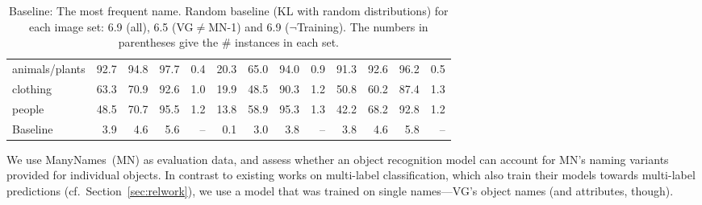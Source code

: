\begin{table*}
\begin{tabular}{l@{~}|@{~}r@{~}r@{~}rr@{~}|@{~}r@{~}r@{~}rr@{~}|@{~}r@{~}r@{~}rr}
		animals/plants &               92.7 &                 94.8 &                   97.7 &            0.4 &            20.3 &              65.0 &                94.0 &         0.9 &             91.3 &               92.6 &                 96.2 &          0.5 \\
		clothing       &               63.3 &                 70.9 &                   92.6 &            1.0 &            19.9 &              48.5 &                90.3 &         1.2 &             50.8 &               60.2 &                 87.4 &          1.3 \\
		people         &               48.5 &                 70.7 &                   95.5 &            1.2 &            13.8 &              58.9 &                95.3 &         1.3 &             42.2 &               68.2 &                 92.8 &          1.2 \\
		\bottomrule
		Baseline       &                3.9 &                  4.6 &                    5.6 &            -- &             0.1 &               3.0 &                 3.8 &         -- &              3.8 &                4.6 &                  5.8 &          -- \\
	\end{tabular}
	\caption{Baseline: The most frequent name. Random baseline (KL with random distributions) for each image set: 6.9 (all), 6.5 (VG$\neq$MN-1) and 6.9 ($\neg$Training). The numbers in parentheses give the \# instances in each set.	\label{tab:model}}
\end{table*}
%
%
We use ManyNames\ (MN) as evaluation data, and assess whether an object recognition model can account for MN's naming variants provided for individual objects. 
In contrast to existing works on multi-label classification, which also train their models towards multi-label predictions 
(cf.\ Section\ \ref{sec:relwork}), we use a model that was trained on single names---VG's object names (and attributes, though). %
